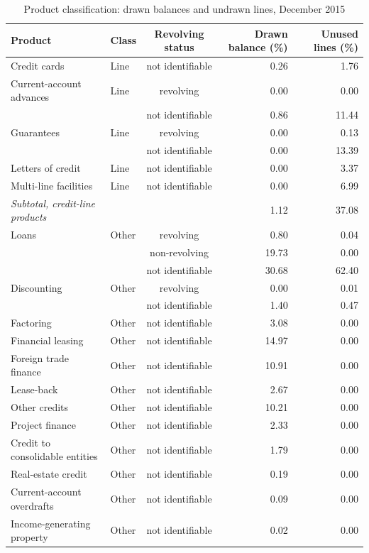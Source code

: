 \documentclass[11pt]{article}
\renewcommand{\_}{\origunderscore\hspace{0pt}}  %
\begin{document}
\begin{table}[!h]
\centering
\small
\caption{Product classification: drawn balances and undrawn lines, December 2015}
\label{tab:products}
\begin{tabular}{@{}llcrr@{}}
\toprule
Product & Class & Revolving status & Drawn balance (\%) & Unused lines (\%) \\
\midrule
Credit cards & Line & not identifiable & 0.26 & 1.76 \\
Current-account advances & Line & revolving & 0.00 & 0.00 \\
 &  & not identifiable & 0.86 & 11.44 \\
Guarantees & Line & revolving & 0.00 & 0.13 \\
 &  & not identifiable & 0.00 & 13.39 \\
Letters of credit & Line & not identifiable & 0.00 & 3.37 \\
Multi-line facilities & Line & not identifiable & 0.00 & 6.99 \\
\midrule
\textit{Subtotal, credit-line products} & & & 1.12 & 37.08 \\
\midrule
Loans & Other & revolving & 0.80 & 0.04 \\
 &  & non-revolving & 19.73 & 0.00 \\
 &  & not identifiable & 30.68 & 62.40 \\
Discounting & Other & revolving & 0.00 & 0.01 \\
 &  & not identifiable & 1.40 & 0.47 \\
Factoring & Other & not identifiable & 3.08 & 0.00 \\
Financial leasing & Other & not identifiable & 14.97 & 0.00 \\
Foreign trade finance & Other & not identifiable & 10.91 & 0.00 \\
Lease-back & Other & not identifiable & 2.67 & 0.00 \\
Other credits & Other & not identifiable & 10.21 & 0.00 \\
Project finance & Other & not identifiable & 2.33 & 0.00 \\
Credit to consolidable entities & Other & not identifiable & 1.79 & 0.00 \\
Real-estate credit & Other & not identifiable & 0.19 & 0.00 \\
Current-account overdrafts & Other & not identifiable & 0.09 & 0.00 \\
Income-generating property & Other & not identifiable & 0.02 & 0.00 \\

\end{tabular}
\end{table}
\end{document}
